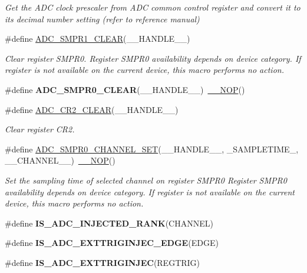 \begin{DoxyCompactItemize}
$$\begin{DoxyCompactList}\small\item\em Get the A\-D\-C clock prescaler from A\-D\-C common control register and convert it to its decimal number setting (refer to reference manual) \end{DoxyCompactList}\item 
\#define \hyperlink{group___a_d_c_ex___private___macro_ga8dbdcfe7ae0e5bdd4b19dba69e8e6663}{A\-D\-C\-\_\-\-S\-M\-P\-R1\-\_\-\-C\-L\-E\-A\-R}(\-\_\-\-\_\-\-H\-A\-N\-D\-L\-E\-\_\-\-\_\-)
\begin{DoxyCompactList}\small\item\em Clear register S\-M\-P\-R0. Register S\-M\-P\-R0 availability depends on device category. If register is not available on the current device, this macro performs no action. \end{DoxyCompactList}\item 
\hypertarget{group___a_d_c_ex___private___macro_gad00b03b06c388c8697193ab6af416478}{\#define {\bfseries A\-D\-C\-\_\-\-S\-M\-P\-R0\-\_\-\-C\-L\-E\-A\-R}(\-\_\-\-\_\-\-H\-A\-N\-D\-L\-E\-\_\-\-\_\-)~\hyperlink{group___c_m_s_i_s___core___instruction_interface_gabd585ddc865fb9b7f2493af1eee1a572}{\-\_\-\-\_\-\-N\-O\-P}()}\label{group___a_d_c_ex___private___macro_gad00b03b06c388c8697193ab6af416478}

\item 
\#define \hyperlink{group___a_d_c_ex___private___macro_ga1e70fe9cf1ff2798afdb13badf58dfcf}{A\-D\-C\-\_\-\-C\-R2\-\_\-\-C\-L\-E\-A\-R}(\-\_\-\-\_\-\-H\-A\-N\-D\-L\-E\-\_\-\-\_\-)
\begin{DoxyCompactList}\small\item\em Clear register C\-R2. \end{DoxyCompactList}\item 
\#define \hyperlink{group___a_d_c_ex___private___macro_ga1281d0f24dba4c7b1e5fa2b5f71a0251}{A\-D\-C\-\_\-\-S\-M\-P\-R0\-\_\-\-C\-H\-A\-N\-N\-E\-L\-\_\-\-S\-E\-T}(\-\_\-\-\_\-\-H\-A\-N\-D\-L\-E\-\_\-\-\_\-, \-\_\-\-S\-A\-M\-P\-L\-E\-T\-I\-M\-E\-\_\-, \-\_\-\-\_\-\-C\-H\-A\-N\-N\-E\-L\-\_\-\-\_\-)~\hyperlink{group___c_m_s_i_s___core___instruction_interface_gabd585ddc865fb9b7f2493af1eee1a572}{\-\_\-\-\_\-\-N\-O\-P}()
\begin{DoxyCompactList}\small\item\em Set the sampling time of selected channel on register S\-M\-P\-R0 Register S\-M\-P\-R0 availability depends on device category. If register is not available on the current device, this macro performs no action. \end{DoxyCompactList}\item 
\#define {\bfseries I\-S\-\_\-\-A\-D\-C\-\_\-\-I\-N\-J\-E\-C\-T\-E\-D\-\_\-\-R\-A\-N\-K}(C\-H\-A\-N\-N\-E\-L)
\item 
\#define {\bfseries I\-S\-\_\-\-A\-D\-C\-\_\-\-E\-X\-T\-T\-R\-I\-G\-I\-N\-J\-E\-C\-\_\-\-E\-D\-G\-E}(E\-D\-G\-E)
\item 
\#define {\bfseries I\-S\-\_\-\-A\-D\-C\-\_\-\-E\-X\-T\-T\-R\-I\-G\-I\-N\-J\-E\-C}(R\-E\-G\-T\-R\-I\-G)
\end{DoxyCompactItemize}


